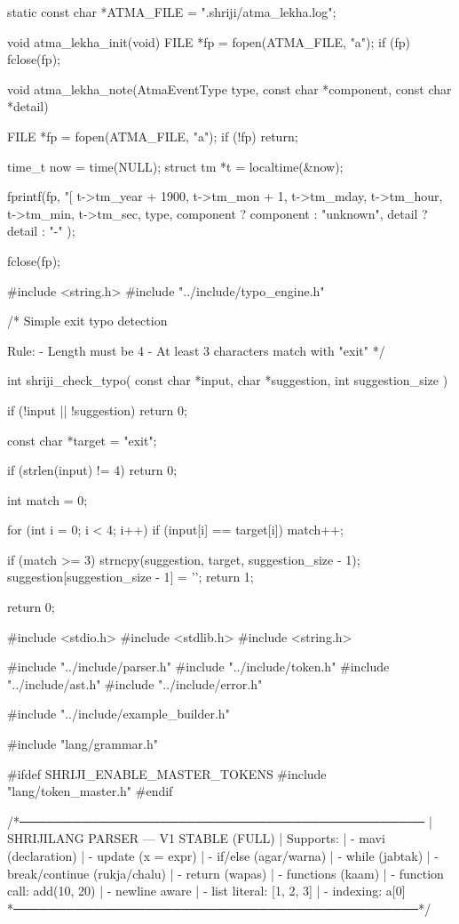 \documentclass{article}
\begin{document}
static const char *ATMA_FILE = ".shriji/atma_lekha.log";

void atma_lekha_init(void)
{
    FILE *fp = fopen(ATMA_FILE, "a");
    if (fp) fclose(fp);
}

void atma_lekha_note(AtmaEventType type,
                     const char *component,
                     const char *detail)
{
    FILE *fp = fopen(ATMA_FILE, "a");
    if (!fp) return;

    time_t now = time(NULL);
    struct tm *t = localtime(&now);

    fprintf(fp,
        "[%
        t->tm_year + 1900,
        t->tm_mon + 1,
        t->tm_mday,
        t->tm_hour,
        t->tm_min,
        t->tm_sec,
        type,
        component ? component : "unknown",
        detail ? detail : "-"
    );

    fclose(fp);
}
#include <string.h>
#include "../include/typo_engine.h"

/*
    Simple exit typo detection

    Rule:
    - Length must be 4
    - At least 3 characters match with "exit"
*/

int shriji_check_typo(
    const char *input,
    char *suggestion,
    int suggestion_size
)
{
    if (!input || !suggestion)
        return 0;

    const char *target = "exit";

    if (strlen(input) != 4)
        return 0;

    int match = 0;

    for (int i = 0; i < 4; i++) {
        if (input[i] == target[i])
            match++;
    }

    if (match >= 3) {
        strncpy(suggestion, target, suggestion_size - 1);
        suggestion[suggestion_size - 1] = '\0';
        return 1;
    }

    return 0;
}
#include <stdio.h>
#include <stdlib.h>
#include <string.h>

#include "../include/parser.h"
#include "../include/token.h"
#include "../include/ast.h"
#include "../include/error.h"

#include "../include/example_builder.h"

#include "lang/grammar.h"

#ifdef SHRIJI_ENABLE_MASTER_TOKENS
#include "lang/token_master.h"
#endif



/*──────────────────────────────────────────────
 | SHRIJILANG PARSER — V1 STABLE (FULL)
 | Supports:
 |   - mavi (declaration)
 |   - update (x = expr)
 |   - if/else (agar/warna)
 |   - while (jabtak)
 |   - break/continue (rukja/chalu)
 |   - return (wapas)
 |   - functions (kaam)
 |   - function call: add(10, 20)
 |   - newline aware
 |   - list literal: [1, 2, 3]
 |   - indexing: a[0]
 *──────────────────────────────────────────────*/
\end{document}
